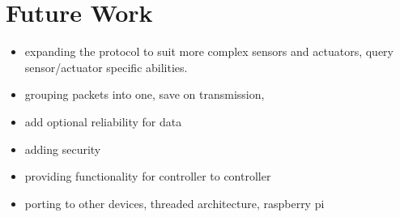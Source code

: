 
\section{Future Work}

\begin{itemize}
	\item expanding the protocol to suit more complex sensors and actuators, query sensor/actuator specific abilities.
	\item grouping packets into one, save on transmission,
	\item add optional reliability for data
	\item adding security
	\item providing functionality for controller to controller
	\item porting to other devices, threaded architecture, raspberry pi
\end{itemize}